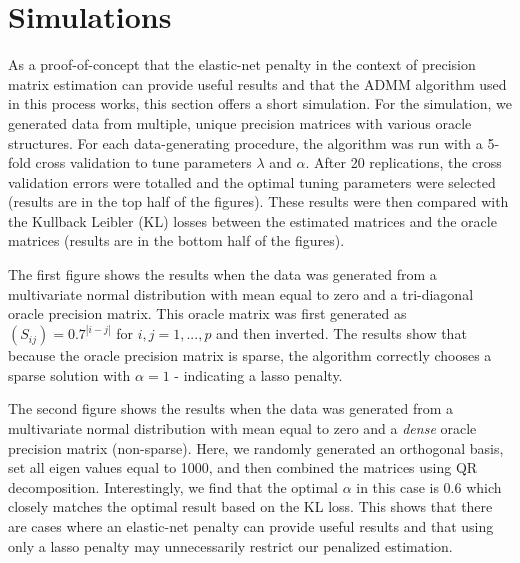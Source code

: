 \documentclass[11pt,]{report}
\theoremstyle{definition}
\theoremstyle{definition}
\theoremstyle{definition}
\theoremstyle{remark}
\begin{document}
\hypertarget{simulations}{%
\section{Simulations}\label{simulations}}

As a proof-of-concept that the elastic-net penalty in the context of precision matrix estimation can provide useful results and that the ADMM algorithm used in this process works, this section offers a short simulation. For the simulation, we generated data from multiple, unique precision matrices with various oracle structures. For each data-generating procedure, the algorithm was run with a 5-fold cross validation to tune parameters \(\lambda\) and \(\alpha\). After 20 replications, the cross validation errors were totalled and the optimal tuning parameters were selected (results are in the top half of the figures). These results were then compared with the Kullback Leibler (KL) losses between the estimated matrices and the oracle matrices (results are in the bottom half of the figures).

The first figure shows the results when the data was generated from a multivariate normal distribution with mean equal to zero and a tri-diagonal oracle precision matrix. This oracle matrix was first generated as \(\left(S_{ij}\right) = 0.7^{\left|i - j \right|}\) for \(i,j = 1,..., p\) and then inverted. The results show that because the oracle precision matrix is sparse, the algorithm correctly chooses a sparse solution with \(\alpha = 1\) - indicating a lasso penalty.

The second figure shows the results when the data was generated from a multivariate normal distribution with mean equal to zero and a \emph{dense} oracle precision matrix (non-sparse). Here, we randomly generated an orthogonal basis, set all eigen values equal to 1000, and then combined the matrices using QR decomposition. Interestingly, we find that the optimal \(\alpha\) in this case is 0.6 which closely matches the optimal result based on the KL loss. This shows that there are cases where an elastic-net penalty can provide useful results and that using only a lasso penalty may unnecessarily restrict our penalized estimation.

\vspace{1cm}
\end{document}
